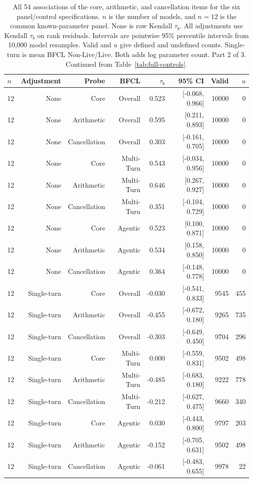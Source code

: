 \begin{table}[t]
\centering
\footnotesize
\setlength{\tabcolsep}{3pt}
\begin{tabular}{lrrrrrrr}
\toprule
$n$ & Adjustment & Probe & BFCL & $\tau_b$ & 95\% CI & Valid & $u$ \\
\midrule
12 & None & Core & Overall & 0.523 & [-0.068, 0.966] & 10000 & 0 \\
12 & None & Arithmetic & Overall & 0.595 & [0.211, 0.893] & 10000 & 0 \\
12 & None & Cancellation & Overall & 0.303 & [-0.161, 0.705] & 10000 & 0 \\
12 & None & Core & Multi-Turn & 0.543 & [-0.034, 0.956] & 10000 & 0 \\
12 & None & Arithmetic & Multi-Turn & 0.646 & [0.267, 0.927] & 10000 & 0 \\
12 & None & Cancellation & Multi-Turn & 0.351 & [-0.104, 0.729] & 10000 & 0 \\
12 & None & Core & Agentic & 0.523 & [0.100, 0.871] & 10000 & 0 \\
12 & None & Arithmetic & Agentic & 0.534 & [0.158, 0.850] & 10000 & 0 \\
12 & None & Cancellation & Agentic & 0.364 & [-0.148, 0.778] & 10000 & 0 \\
12 & Single-turn & Core & Overall & -0.030 & [-0.541, 0.833] & 9545 & 455 \\
12 & Single-turn & Arithmetic & Overall & -0.455 & [-0.672, 0.180] & 9265 & 735 \\
12 & Single-turn & Cancellation & Overall & -0.303 & [-0.649, 0.450] & 9704 & 296 \\
12 & Single-turn & Core & Multi-Turn & 0.000 & [-0.559, 0.831] & 9502 & 498 \\
12 & Single-turn & Arithmetic & Multi-Turn & -0.485 & [-0.683, 0.180] & 9222 & 778 \\
12 & Single-turn & Cancellation & Multi-Turn & -0.212 & [-0.627, 0.475] & 9660 & 340 \\
12 & Single-turn & Core & Agentic & 0.030 & [-0.443, 0.800] & 9797 & 203 \\
12 & Single-turn & Arithmetic & Agentic & -0.152 & [-0.705, 0.631] & 9502 & 498 \\
12 & Single-turn & Cancellation & Agentic & -0.061 & [-0.483, 0.655] & 9978 & 22 \\
\bottomrule
\end{tabular}
\caption{All 54 associations of the core, arithmetic, and cancellation items for the six panel/control specifications. $n$ is the number of models, and $n=12$ is the common known-parameter panel. None is raw Kendall $\tau_b$. All adjustments use Kendall $\tau_b$ on rank residuals. Intervals are pointwise 95\% percentile intervals from 10,000 model resamples. Valid and $u$ give defined and undefined counts. Single-turn is mean BFCL Non-Live/Live. Both adds log parameter count. Part 2 of 3. Continued from Table~\ref{tab:full-controls}.}
\label{tab:full-controls:continued-2}
\end{table}

